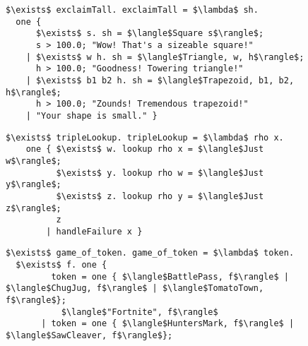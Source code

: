 \documentclass[manuscript,screen 12pt, nonacm]{acmart}
\begin{document}
    \begin{figure}[ht] 
        \begin{minipage}[h]{0.54\linewidth}
          \verselst
          \begin{lstlisting}[numbers=none, basicstyle=\tiny, xleftmargin=.2em,
                            showstringspaces=false,
                            frame=single]
$\exists$ exclaimTall. exclaimTall = $\lambda$ sh. 
  one { 
      $\exists$ s. sh = $\langle$Square s$\rangle$; 
      s > 100.0; "Wow! That's a sizeable square!"
    | $\exists$ w h. sh = $\langle$Triangle, w, h$\rangle$; 
      h > 100.0; "Goodness! Towering triangle!"
    | $\exists$ b1 b2 h. sh = $\langle$Trapezoid, b1, b2, h$\rangle$;
      h > 100.0; "Zounds! Tremendous trapezoid!"
    | "Your shape is small." }
            \end{lstlisting}
            \label{fig:verseexclaimtall} 
        \end{minipage}%
        \begin{minipage}[h]{0.5\linewidth}
          \verselst
          \begin{lstlisting}[numbers=none, basicstyle=\tiny, xleftmargin=2em,
                        frame=single]
$\exists$ tripleLookup. tripleLookup = $\lambda$ rho x. 
    one { $\exists$ w. lookup rho x = $\langle$Just w$\rangle$; 
          $\exists$ y. lookup rho w = $\langle$Just y$\rangle$; 
          $\exists$ z. lookup rho y = $\langle$Just z$\rangle$;
          z
        | handleFailure x }
          \end{lstlisting}
            \label{fig:versetriplelookup} 
        \vspace{4ex}
        \end{minipage} 
        \begin{minipage}[h]{\linewidth}
          \verselst
          \begin{lstlisting}[numbers=none, basicstyle=\tiny, xleftmargin=9em, 
                            frame=single, showstringspaces=false]
$\exists$ game_of_token. game_of_token = $\lambda$ token. 
  $\exists$ f. one {
         token = one { $\langle$BattlePass, f$\rangle$ | $\langle$ChugJug, f$\rangle$ | $\langle$TomatoTown, f$\rangle$}; 
           $\langle$"Fortnite", f$\rangle$
       | token = one { $\langle$HuntersMark, f$\rangle$ | $\langle$SawCleaver, f$\rangle$}; 

\end{lstlisting}
\end{minipage}
\end{figure}
\end{document}
